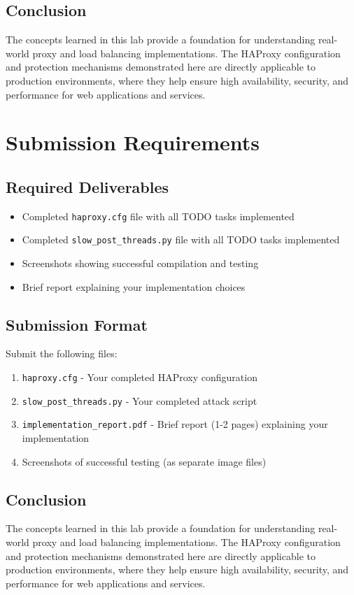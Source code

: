 \documentclass[12pt]{article}
\begin{document}
    \subsection{Conclusion}
    The concepts learned in this lab provide a foundation for understanding real-world proxy and load balancing implementations. The HAProxy configuration and protection mechanisms demonstrated here are directly applicable to production environments, where they help ensure high availability, security, and performance for web applications and services.


    \section{Submission Requirements}

    \subsection{Required Deliverables}
    \begin{itemize}
        \item Completed \texttt{haproxy.cfg} file with all TODO tasks implemented
        \item Completed \texttt{slow\_post\_threads.py} file with all TODO tasks implemented
        \item Screenshots showing successful compilation and testing
        \item Brief report explaining your implementation choices
    \end{itemize}

    \subsection{Submission Format}
    Submit the following files:
    \begin{enumerate}
        \item \texttt{haproxy.cfg} - Your completed HAProxy configuration
        \item \texttt{slow\_post\_threads.py} - Your completed attack script
        \item \texttt{implementation\_report.pdf} - Brief report (1-2 pages) explaining your implementation
        \item Screenshots of successful testing (as separate image files)
    \end{enumerate}


    \subsection{Conclusion}
    The concepts learned in this lab provide a foundation for understanding real-world proxy and load balancing implementations. The HAProxy configuration and protection mechanisms demonstrated here are directly applicable to production environments, where they help ensure high availability, security, and performance for web applications and services.
\end{document}
